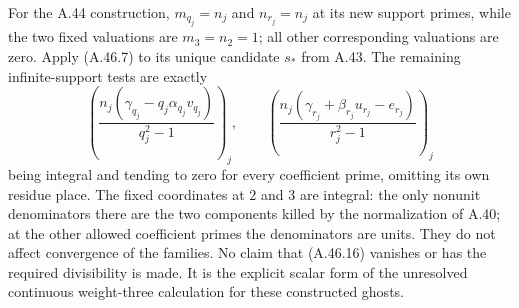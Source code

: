 For the A.44 construction, $m_{q_j}=n_j$ and $n_{r_j}=n_j$
at its new support primes, while the two fixed valuations
are $m_3=n_2=1$; all other corresponding valuations are
zero.  Apply (A.46.7) to its unique candidate $s_*$ from
A.43.  The remaining infinite-support tests are exactly
\[
 \left(\frac{n_j(\gamma_{q_j}-q_j\alpha_{q_j}v_{q_j})}
                    {q_j^2-1}\right)_j,
 \qquad
 \left(\frac{n_j(\gamma_{r_j}+\beta_{r_j}u_{r_j}-e_{r_j})}
                    {r_j^2-1}\right)_j
 \tag{A.46.16}
\]
being integral and tending to zero for every coefficient
prime, omitting its own residue place.  The fixed coordinates
at $2$ and $3$ are integral: the only nonunit denominators
there are the two components killed by the normalization of
A.40; at the other allowed coefficient primes the denominators
are units.  They do not affect convergence of the families.
No claim that (A.46.16) vanishes or has the required divisibility
is made.  It is the explicit scalar form of the unresolved
continuous weight-three calculation for these constructed ghosts.
